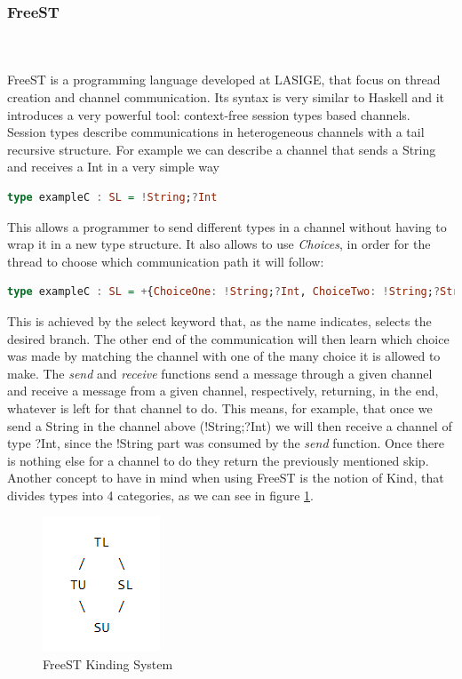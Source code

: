 \documentclass[runningheads]{llncs}
\begin{document}
\subsubsection{FreeST}\hfill\\\\
FreeST is a programming language developed at LASIGE, that focus on thread creation and channel communication. Its syntax is very similar to Haskell and it introduces a very powerful tool: context-free session types based channels.\\
Session types describe communications in heterogeneous channels with a tail recursive structure.
For example we can describe a channel that sends a String and receives a Int in a very simple way
\begin{lstlisting}[language=haskell]
type exampleC : SL = !String;?Int
\end{lstlisting}
This allows a programmer to send different types in a channel without having to wrap it in a new type structure.
It also allows to use {\it Choices}, in order for the thread to choose which communication path it will follow:
\begin{lstlisting}[language=haskell]
type exampleC : SL = +{ChoiceOne: !String;?Int, ChoiceTwo: !String;?String}
\end{lstlisting}
This is achieved by the select keyword that, as the name indicates, selects the desired branch. The other end of the communication will then learn which choice was made by matching the channel with one of the many choice it is allowed to make.
The {\it send} and {\it receive} functions send a message through a given channel and receive a message from a given channel, respectively, returning, in the end, whatever is left for that channel to do. This means, for example, that once we send a String in the channel above (!String;?Int) we will then receive a channel of type ?Int, since the !String part was consumed by the {\it send} function. Once there is nothing else for a channel to do they return the previously mentioned skip.
Another concept to have in mind when using FreeST is the notion of Kind, that divides types into 4 categories, as we can see in figure \ref{kind}.
\begin{figure}[H]
\centering
\includegraphics[scale=1]{kind.png}
\caption{FreeST Kinding System}
\label{kind}
\end{figure}
\end{document}
